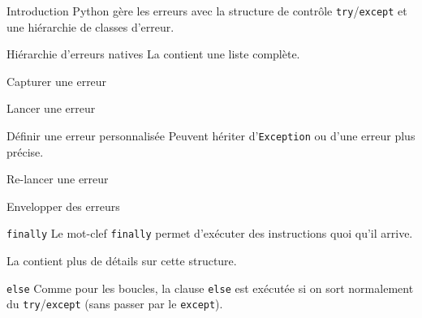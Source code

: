 \begin{frame}{Introduction}
  Python gère les erreurs avec la structure de contrôle \texttt{try}/\texttt{except} et une hiérarchie de classes d'erreur.
\end{frame}

\begin{frame}{Hiérarchie d'erreurs natives}
  La  contient une liste complète.
\end{frame}

\begin{frame}{Capturer une erreur}
\end{frame}

\begin{frame}{Lancer une erreur}
\end{frame}

\begin{frame}{Définir une erreur personnalisée}
  Peuvent hériter d'\texttt{Exception} ou d'une erreur plus précise.
\end{frame}

\begin{frame}{Re-lancer une erreur}
\end{frame}

\begin{frame}{Envelopper des erreurs}
\end{frame}

\begin{frame}{\texttt{finally}}
  Le mot-clef \texttt{finally} permet d'exécuter des instructions quoi qu'il arrive.

  La  contient plus de détails sur cette structure.

\end{frame}

\begin{frame}{\texttt{else}}
  Comme pour les boucles, la clause \texttt{else} est exécutée si on sort normalement du \texttt{try}/\texttt{except} (sans passer par le \texttt{except}).
\end{frame}
